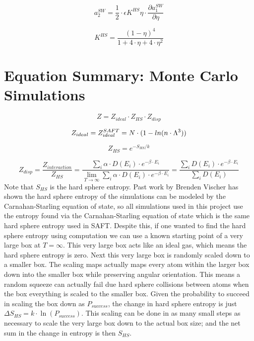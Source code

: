 \begin{multicols}{2}
\begin{equation}\label{eq:saft38}
a_2^{SW}=\frac{1}{2}\cdot \epsilon K^{HS}\eta\cdot \frac{\partial a_1^{SW}}{\partial \eta}
\end{equation}

\begin{equation}\label{eq:saft22}
K^{HS}=\frac{(1-\eta)^4}{1+4\cdot \eta+4\cdot \eta^2}
\end{equation}
\end{multicols}

\section{Equation Summary: Monte Carlo Simulations}
\begin{equation}\label{eq:MC1}
Z=Z_{ideal}\cdot Z_{HS}\cdot Z_{disp}
\end{equation}

\begin{equation}\label{eq:MC2}
Z_{ideal}=Z_{ideal}^{SAFT}=N\cdot(1-\\ln(n\cdot \Lambda^3))
\end{equation}

\begin{equation}\label{eq:MC3}
Z_{HS}=e^{-S_{HS}/k}
\end{equation}

\begin{equation}\label{eq:MC4}
Z_{disp}=\frac{Z_{interaction}}{Z_{HS}}=\frac{\sum_i \alpha\cdot D(E_i)\cdot e^{-\beta\cdot E_i}}{\lim_{T\to\infty}\sum_i \alpha\cdot D(E_i)\cdot e^{-\beta\cdot E_i}}=\frac{\sum_i D(E_i)\cdot e^{-\beta\cdot E_i}}{\sum_i D(E_i)}
\end{equation}
Note that $S_{HS}$ is the hard sphere entropy. Past work by Brenden Vischer\cite{Brenden} has shown the hard sphere entropy of the simulations can be modeled by the Carnahan-Starling equation of state, so all simulations used in this project use the entropy found via the Carnahan-Starling equation of state which is the same hard sphere entropy used in SAFT. Despite this, if one wanted to find the hard sphere entropy using computation we can use a known starting point of a very large box at $T=\infty$. This very large box acts like an ideal gas, which means the hard sphere entropy is zero. Next this very large box is randomly scaled down to a smaller box. The scaling maps actually maps every atom within the larger box down into the smaller box while preserving angular orientation. This means a random squeeze can actually fail due hard sphere collisions between atoms when the box everything is scaled to the smaller box. Given the probability to succeed in scaling the box down as $P_{success}$, the change in hard sphere entropy is just $\Delta S_{HS}=k\cdot \ln(P_{success})$. This scaling can be done in as many small steps as necessary to scale the very large box down to the actual box size; and the net sum in the change in entropy is then $S_{HS}$.

